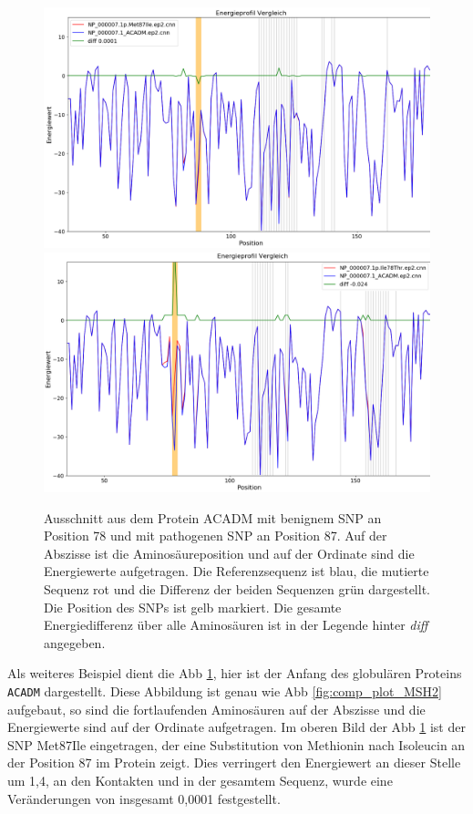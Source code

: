 \begin{figure}
    \centering
    \includegraphics[width=.95\textwidth]{images/comp_plot_ACADM_Met87Ile.png}
    \includegraphics[width=.95\textwidth]{images/comp_plot_ACADM_Ile78Thr.png}
    \caption{Ausschnitt aus dem Protein ACADM mit benignem \ac{SNP} an Position 78 und mit pathogenen \ac{SNP} an Position 87. Auf der Abszisse ist die Aminosäureposition und auf der Ordinate sind die Energiewerte aufgetragen. Die Referenzsequenz ist blau, die mutierte Sequenz rot und die Differenz der beiden Sequenzen grün dargestellt. Die Position des \ac{SNP}s ist gelb markiert. Die gesamte Energiedifferenz über alle Aminosäuren ist in der Legende hinter \emph{diff} angegeben.}
    \label{fig:comp_plot_ACADM}
\end{figure}

Als weiteres Beispiel dient die \ac{Abb} \ref{fig:comp_plot_ACADM}, hier ist der Anfang des globulären Proteins \texttt{ACADM} dargestellt. Diese Abbildung ist genau wie \ac{Abb} \ref{fig:comp_plot_MSH2} aufgebaut, so sind die fortlaufenden Aminosäuren auf der Abszisse und die Energiewerte sind auf der Ordinate aufgetragen. Im oberen Bild der \ac{Abb} \ref{fig:comp_plot_ACADM} ist der \ac{SNP} Met87Ile eingetragen, der eine Substitution von Methionin nach Isoleucin an der Position 87 im Protein zeigt. Dies verringert den Energiewert an dieser Stelle um 1,4, an den Kontakten und in der gesamtem Sequenz, wurde eine Veränderungen von insgesamt 0,0001 festgestellt.

